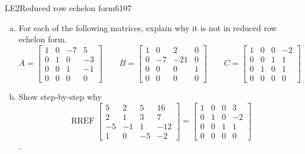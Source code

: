 
\begin{exercise}{LE2}{Reduced row echelon form}{6107} 
\begin{exerciseStatement} 

\begin{enumerate}[(a)]
\item  

 For each of the following matrices, explain why it is not in reduced row echelon form. \[
                            A = \left[\begin{array}{cccc}
1 & 0 & -7 & 5 \\
0 & 1 & 0 & -3 \\
0 & 0 & 1 & -1 \\
0 & 0 & 0 & 0
\end{array}\right] \hspace{2em}
                            B = \left[\begin{array}{cccc}
1 & 0 & 2 & 0 \\
0 & -7 & -21 & 0 \\
0 & 0 & 0 & 1 \\
0 & 0 & 0 & 0
\end{array}\right] \hspace{2em}
                            C = \left[\begin{array}{cccc}
1 & 0 & 0 & -2 \\
0 & 0 & 1 & 1 \\
0 & 1 & 0 & 1 \\
0 & 0 & 0 & 0
\end{array}\right] \hspace{2em}
                        \hspace{2em}
                    \] 

 
\item  

 Show step-by-step why \[\operatorname{RREF}\left[\begin{array}{cccc}
5 & 2 & 5 & 16 \\
2 & 1 & 3 & 7 \\
-5 & -1 & 1 & -12 \\
1 & 0 & -5 & -2
\end{array}\right]=\left[\begin{array}{cccc}
1 & 0 & 0 & 3 \\
0 & 1 & 0 & -2 \\
0 & 0 & 1 & 1 \\
0 & 0 & 0 & 0
\end{array}\right]\]. 

 
\end{enumerate}


\end{exerciseStatement}
\end{exercise}
